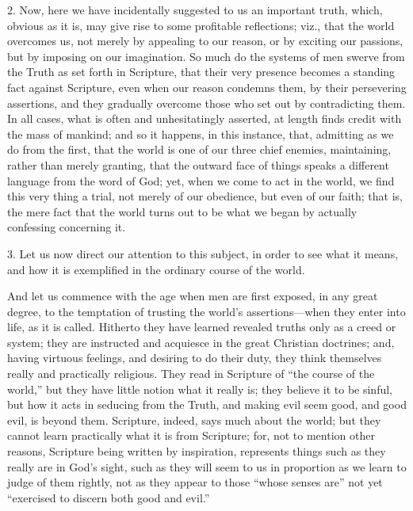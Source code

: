 2. Now, here we have incidentally suggested to us an important
truth, which, obvious as it is, may give rise to some profitable
reflections; viz., that the world overcomes us, not merely by
appealing to our reason, or by exciting our passions, but by imposing
on our imagination. So much do the systems of men swerve from the
Truth as set forth in Scripture, that their very presence becomes a
standing fact against Scripture, even when our reason condemns them,
by their persevering assertions, and they gradually overcome those who
set out by contradicting them. In all cases, what is often and
unhesitatingly asserted, at length finds credit with the mass of
mankind; and so it happens, in this instance, that, admitting as we do
from the first, that the world is one of our three chief enemies,
maintaining, rather than merely granting, that the outward face of
things speaks a different language from the word of God; yet, when we
come to act in the world, we find this very thing a trial, not merely
of our obedience, but even of our faith; that is, the mere fact that
the world turns out to be what we began by actually confessing
concerning it.

3. Let us now direct our attention to this subject, in order to see
what it means, and how it is exemplified in the ordinary course of the
world.

And let us commence with the age when men are first exposed, in any
great degree, to the temptation of trusting the world's assertions—when
they enter into life, as it is called. Hitherto they have learned
revealed truths only as a creed or system; they are instructed and
acquiesce in the great Christian doctrines; and, having virtuous
feelings, and desiring to do their duty, they think themselves really
and practically religious. They read in Scripture of ``the course
of the world,'' but they have little notion what it really is;
they believe it to be sinful, but how it acts in seducing from the
Truth, and making evil seem good, and good evil, is beyond them.
Scripture, indeed, says much about the world; but they cannot learn
practically what it is from Scripture; for, not to mention other
reasons, Scripture being written by inspiration, represents things
such as they really are in God's sight, such as they will seem to us
in proportion as we learn to judge of them rightly, not as they appear
to those ``whose senses are'' not yet ``exercised to
discern both good and evil.''

